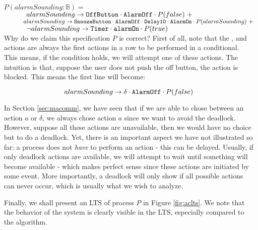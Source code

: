 $P(alarmSounding:\mathds{B}) =$ \\
$~\hspace*{1cm} alarmSounding \rightarrow \texttt{OffButton} \cdot \texttt{AlarmOff} \cdot P(false)~+$ \\
$~\hspace*{1cm} alarmSounding \rightarrow \texttt{SnoozeButton} \cdot \texttt{AlarmOff} \cdot \texttt{Delay10} \cdot \texttt{AlarmOn} \cdot P(alarmSounding)~+$ \\
$~\hspace*{1cm} \lnot alarmSounding \rightarrow \texttt{Timer} \cdot \texttt{alarmOn} \cdot P(true)$ \\

Why do we claim this specification $P$ is correct? First of all, note that the ,  and  actions are always the first actions in a row to be performed in a conditional. This means, if the condition holds, we will attempt one of these actions. The intuition is that, suppose the user does not push the off button, the  action is blocked. This means the first line will become:

\begin{displaymath} alarmSounding \rightarrow \delta \cdot \texttt{AlarmOff} \cdot P(false) \end{displaymath}

In Section \ref{sec:macomm}, we have seen that if we are able to chose between an action $a$ or $\delta$, we always chose action $a$ since we want to avoid the deadlock. However, suppose all these actions are unavailable, then we would have no choice but to do a deadlock. Yet, there is an important aspect we have not illustrated so far: a process does not \emph{have} to perform an action - this can be delayed. Usually, if only deadlock actions are available, we will attempt to wait until something will become available - which makes perfect sense since these actions are initiated by some event. More importantly, a deadlock will only show if all possible actions can never occur, which is usually what we wish to analyze.

Finally, we shall present an LTS of process $P$ in Figure \ref{fig:aclts}. We note that the behavior of the system is clearly visible in the LTS, especially compared to the algorithm.

